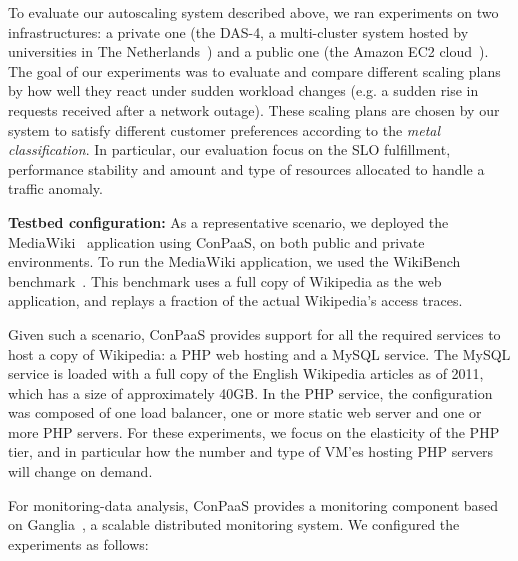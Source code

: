 
To evaluate our autoscaling system described above, we ran experiments
on two infrastructures: a private one (the DAS-4, a multi-cluster system
hosted by universities in The Netherlands~\cite{das4}) and a public
one (the Amazon EC2 cloud~\cite{amazonEC2}). The goal of our experiments
was to evaluate and compare different scaling plans by how well they react under sudden
workload changes (e.g. a sudden rise in requests received after a network outage). These scaling plans are chosen by our system to satisfy different customer preferences according to the \emph{metal classification}. In particular, our evaluation focus on
the SLO fulfillment, performance stability and amount and type of resources allocated to handle
a traffic anomaly. 



\textbf{Testbed configuration:}  As a representative scenario, we deployed the MediaWiki~\cite{mediawiki} application using ConPaaS, on both public and private environments. To run the MediaWiki application, we used the WikiBench benchmark~\cite{wikibench}. This benchmark uses a full copy of Wikipedia as the web application, and replays a fraction of the actual Wikipedia's access traces. 

Given such a scenario, ConPaaS provides support for all the required services to host a copy of Wikipedia: a PHP web hosting and a MySQL service. The MySQL service is loaded with a full copy of the English Wikipedia articles as of 2011, which has a size of approximately 40GB.  In the PHP service, the configuration was composed of one load balancer, one or more static web server and one or more PHP servers. For these experiments, we focus on the elasticity of the PHP tier, and in particular how the number and type of VM'es hosting PHP servers will change on demand.

For monitoring-data analysis, ConPaaS provides a monitoring component based on Ganglia~\cite{ganglia}, a scalable distributed monitoring system. We configured the experiments as follows:

